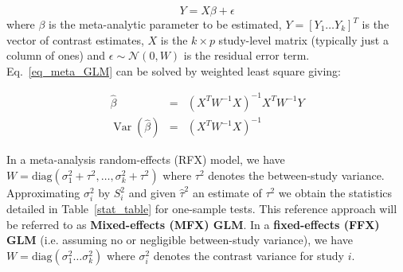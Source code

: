 \documentclass{llncs}
\DeclareMathOperator{\Var}{Var}
\newcommand{\effectvector}{Y}
\newcommand{\effect}[1][i]{\effectvector_{#1}}
\newcommand{\vareffect}[1][i]{S^2_{#1}}
\newcommand{\nStudies}{k}
\newcommand{\varBetween}{\tau^2}
\newcommand{\estvarBetween}{\hat\tau^2}
\newcommand{\varWithin}[1][i]{\sigma^2_{#1}}
\newcommand{\transpose}{^T}
\begin{document}
\begin{equation}
	\effectvector = X \beta + \epsilon
	\label{eq_meta_GLM}
\end{equation}
where $\beta$ is the meta-analytic parameter to be estimated, $Y = [\effect[1] \ldots \effect[\nStudies] ]\transpose$ is the vector of contrast estimates, $X$ is the $k\times p$ study-level matrix (typically just a column of ones) and $\epsilon \sim \mathcal{N}(0,W)$ is the residual error term. Eq.~\eqref{eq_meta_GLM} can be solved by weighted least square giving:


\begin{eqnarray}
	\hat \beta  &=& (X\transpose W^{-1} X)^{-1} X\transpose W^{-1} \effectvector \\
	\Var(\hat \beta)  &=& (X\transpose W^{-1} X)^{-1}
	\label{eq_WLS}
\end{eqnarray}

In a meta-analysis random-effects (RFX) model, we have $W = \mathrm{diag}( \varWithin[1] + \varBetween, \ldots ,\varWithin[\nStudies] + \varBetween )$ where $\varBetween$ denotes the between-study variance. Approximating $\varWithin$ by $\vareffect$ and given $\estvarBetween$ an estimate of $\varBetween$ we obtain the statistics detailed in Table~\ref{stat_table} for one-sample tests. This reference approach will be referred to as \textbf{Mixed-effects (MFX) GLM}.
In a \textbf{fixed-effects (FFX) GLM} (i.e. assuming no or negligible between-study variance), we have $W = \mathrm{diag}( \varWithin[1] \ldots \varWithin[\nStudies] )$ where $\varWithin$ denotes the contrast variance for study $i$. 
\end{document}
